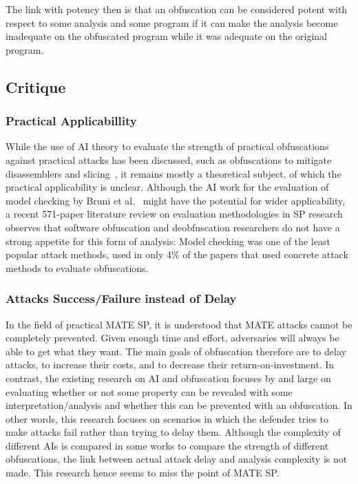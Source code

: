 The link with potency then is that an obfuscation can be considered potent with respect to some analysis and some program if it can make the analysis become inadequate on the obfuscated program while it was adequate on the original program. 

\subsection{Critique}

\subsubsection{Practical Applicabillity}
\label{sec:ai_practical}
While the use of AI theory to evaluate the strength of practical obfuscations against practical attacks has been discussed, such as obfuscations to mitigate disassemblers and slicing~\cite{2017GMDP}, it remains mostly a theoretical subject, of which the practical applicability is unclear. Although the AI work for the evaluation of model checking by Bruni et al.~\cite{bruni2018code1,bruni2018code2} might have the potential for wider applicability, a recent 571-paper literature review on evaluation methodologies in SP research~\cite{desutter2024evaluation} observes that software obfuscation and deobfuscation researchers do not have a strong appetite for this form of analysis: Model checking was one of the least popular attack methods, used in only 4\% of the papers that used concrete attack methods to evaluate obfuscations. 

\subsubsection{Attacks Success/Failure instead of Delay}
In the field of practical MATE SP, it is understood that MATE attacks cannot be completely prevented. Given enough time and effort, adversaries will always be able to get what they want. The main goals of obfuscation therefore are to delay attacks, to increase their costs, and to decrease their return-on-investment. In contrast, the existing research on AI and obfuscation focuses by and large on evaluating whether or not some property can be revealed with some interpretation/analysis and whether this can be prevented with an obfuscation. In other words, this research focuses on scenarios in which the defender tries to make attacks fail rather than trying to delay them. Although the complexity of different AIs is compared in some works to compare the strength of different obfuscations, the link between actual attack delay and analysis complexity is not made. This research hence seems to miss the point of MATE SP. 

